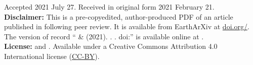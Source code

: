 \documentclass[twocolumn,10pt]{article}
\newcommand{\Author}{%
  \SolerShort{} \& \UiedaShort
}
\newcommand{\AuthorLong}{%
  \Soler{} and \Uieda
}
\newcommand{\AuthorAffil}{%
    {\large
      \Soler$^{1,2}$ \orcidlink{\SolerORCID} and
        \Uieda$^{3}$ \orcidlink{\UiedaORCID}
    }
    \\[0.4cm]
    {\small $^{1}$\CONICET (\SolerMail)} \\
    {\small $^{2}$\IGSV} \\
    {\small $^{3}$\Liverpool} \\
}
\newcommand{\Year}{2021}
\begin{document}
\title{\Title}
\author{\AuthorAffil}
\date{
    \normalsize
    \Year
}
\maketitle

\noindent
Accepted 2021 July 27. Received in original form 2021 February 21.
\\[0.5cm]
\noindent
\textbf{Disclaimer:}
This is a pre-copyedited, author-produced PDF of an article
published in \Journal{} following peer review.
It is available from EarthArXiv at
\href{https://doi.org/\PreprintDOI}{doi.org/\PreprintDOI}.
The version of record
``\Author{} (\Year{}). \Title{}. \Journal{}. doi:\DOI{}''
is available online at \DOILink{}.
\\[0.5cm]
\noindent
\textbf{License:}
\textcopyright{} \the\year{} \AuthorLong{}.
Available under a Creative Commons Attribution 4.0 International license
(\href{https://creativecommons.org/licenses/by/4.0/}{CC-BY}).


\begin{abstract}
    
\end{abstract}











\end{document}

